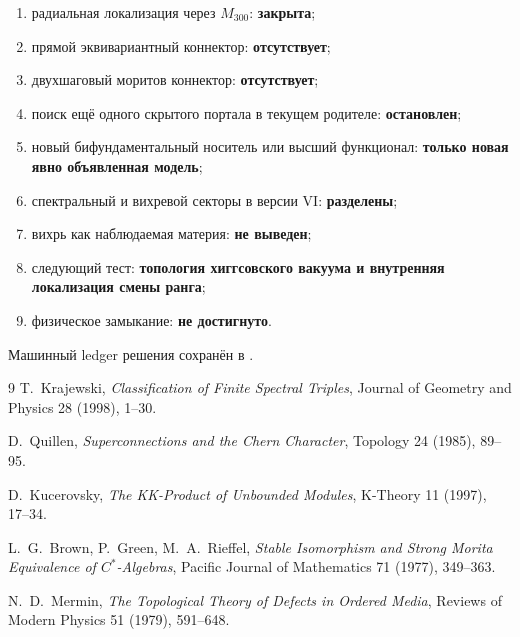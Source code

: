 \begin{protocol}
\begin{enumerate}
 \item радиальная локализация через $M_{300}$: \textbf{закрыта};
 \item прямой эквивариантный коннектор: \textbf{отсутствует};
 \item двухшаговый моритов коннектор: \textbf{отсутствует};
 \item поиск ещё одного скрытого портала в текущем родителе:
 \textbf{остановлен};
 \item новый бифундаментальный носитель или высший функционал:
 \textbf{только новая явно объявленная модель};
 \item спектральный и вихревой секторы в версии VI:
 \textbf{разделены};
 \item вихрь как наблюдаемая материя: \textbf{не выведен};
 \item следующий тест: \textbf{топология хиггсовского вакуума и
 внутренняя локализация смены ранга};
 \item физическое замыкание: \textbf{не достигнуто}.
\end{enumerate}
\end{protocol}

Машинный ledger решения сохранён в
.

\begin{thebibliography}{9}
T.~Krajewski,
\emph{Classification of Finite Spectral Triples},
Journal of Geometry and Physics 28 (1998), 1--30.

D.~Quillen,
\emph{Superconnections and the Chern Character},
Topology 24 (1985), 89--95.

D.~Kucerovsky,
\emph{The KK-Product of Unbounded Modules},
K-Theory 11 (1997), 17--34.

L.~G.~Brown, P.~Green, M.~A.~Rieffel,
\emph{Stable Isomorphism and Strong Morita Equivalence of
$C^*$-Algebras},
Pacific Journal of Mathematics 71 (1977), 349--363.

N.~D.~Mermin,
\emph{The Topological Theory of Defects in Ordered Media},
Reviews of Modern Physics 51 (1979), 591--648.
\end{thebibliography}